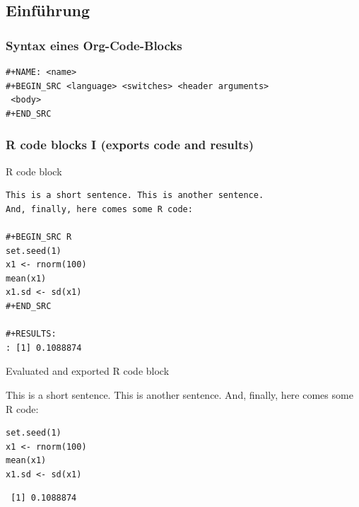 \documentclass[bigger]{beamer}
\begin{document}
\subsection{Einführung}
\label{sec-3-1}
\begin{frame}[fragile]
\frametitle{Syntax eines Org-Code-Blocks}
\label{sec-3-1-1}


\begin{small}

\begin{verbatim}
#+NAME: <name>
#+BEGIN_SRC <language> <switches> <header arguments>
 <body>
#+END_SRC
\end{verbatim}
\end{small}
\end{frame}
\begin{frame}[fragile,t, shrink = 15]
\frametitle{R code blocks I (exports code and results)}
\label{sec-3-1-2}
\begin{block}{R code block}
\label{sec-3-1-2-1}


\begin{verbatim}
This is a short sentence. This is another sentence. 
And, finally, here comes some R code:

#+BEGIN_SRC R
set.seed(1)
x1 <- rnorm(100) 
mean(x1) 
x1.sd <- sd(x1) 
#+END_SRC

#+RESULTS:
: [1] 0.1088874
\end{verbatim}
\end{block}
\begin{block}{Evaluated and exported R code block}
\label{sec-3-1-2-2}


This is a short sentence. This is another sentence. And, finally, here comes some R code:

\lstset{language=R}
\begin{lstlisting}
set.seed(1)
x1 <- rnorm(100)
mean(x1)
x1.sd <- sd(x1)
\end{lstlisting}

\begin{verbatim}
 [1] 0.1088874
\end{verbatim}
\end{block}
\end{frame}
\end{document}
